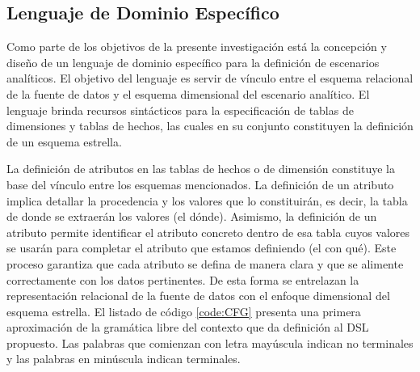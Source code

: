 \subsection{Lenguaje de Dominio Espec\'ifico}

Como parte de los objetivos de la presente investigación est\'a la concepción y diseño de un lenguaje de dominio 
específico para la definición de escenarios analíticos. El objetivo del lenguaje es servir de vínculo 
entre el esquema relacional de la fuente de datos y el esquema dimensional del escenario analítico. El lenguaje 
brinda recursos sintácticos para la especificación de tablas de dimensiones y tablas de hechos, las cuales 
en su conjunto constituyen la definición de un esquema estrella.

La definición de atributos en las tablas de hechos o de dimensión constituye la base del vínculo entre 
los esquemas mencionados. La definición de un atributo 
implica detallar la procedencia y los valores que lo constituirán, es decir, la tabla de donde se extraerán los 
valores (el dónde). Asimismo, la definición de un atributo permite identificar el atributo concreto dentro de esa 
tabla cuyos valores se usarán para completar el atributo 
que estamos definiendo (el con qué). Este proceso garantiza que cada atributo se defina de manera clara y que 
se alimente correctamente con los datos pertinentes. De esta forma se entrelazan la representación relacional 
de la fuente de datos con el enfoque dimensional del esquema estrella. El listado de código \ref{code:CFG} presenta 
una primera aproximación de la gramática 
libre del contexto que da definición al DSL propuesto. Las palabras que comienzan con letra mayúscula indican no terminales y 
las palabras en minúscula indican terminales.

